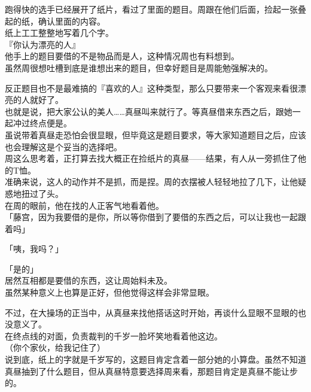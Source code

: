 跑得快的选手已经展开了纸片，看过了里面的题目。周跟在他们后面，捡起一张叠起的纸，确认里面的内容。\\

纸上工工整整地写着几个字。\\

『你认为漂亮的人』\\

他手上的题目要借的不是物品而是人，这种情况周也有料想到。\\

虽然周很想吐槽到底是谁想出来的题目，但幸好题目是周能勉强解决的。

反正题目也不是最难搞的『喜欢的人』这种类型，那么只要带来一个客观来看很漂亮的人就好了。\\

也就是说，把大家公认的美人……真昼叫来就行了。等真昼借来东西之后，跟她一起冲过终点便是。\\

虽说带着真昼走恐怕会很显眼，但毕竟这是题目要求，等大家知道题目之后，应该也会理解这是个妥当的选择吧。\\

周这么思考着，正打算去找大概正在捡纸片的真昼——结果，有人从一旁抓住了他的T恤。\\

准确来说，这人的动作并不是抓，而是捏。周的衣摆被人轻轻地拉了几下，让他疑惑地扭过了头。\\

在周的眼前，他在找的人正客气地看着他。\\

「藤宫，因为我要借的是你，所以等你借到了要借的东西之后，可以让我也一起跟着吗」

「咦，我吗？」

「是的」\\

居然互相都是要借的东西，这让周始料未及。\\

虽然某种意义上也算是正好，但他觉得这样会非常显眼。

不过，在大操场的正当中，从真昼来找他搭话这时开始，再谈什么显眼不显眼的也没意义了。\\

在终点线的对面，负责裁判的千岁一脸坏笑地看着他这边。\\

（你个家伙，给我记住了）\\

说到底，纸上的字就是千岁写的，这题目肯定含着一部分她的小算盘。虽然不知道真昼抽到了什么题目，但从真昼特意要选择周来看，那题目肯定是真昼不能让步的。\\

